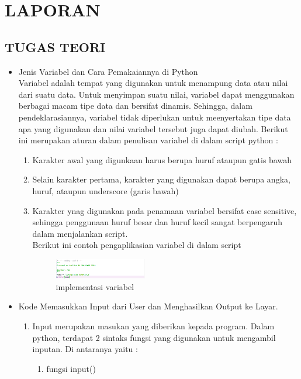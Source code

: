 \chapter{LAPORAN}
\section{TUGAS TEORI}
\begin{itemize}
	\item Jenis Variabel dan Cara Pemakaiannya di Python\\
		Variabel adalah tempat yang digunakan untuk menampung data atau nilai dari suatu data. Untuk menyimpan suatu nilai, variabel dapat menggunakan berbagai macam tipe data dan bersifat dinamis. Sehingga, dalam pendeklarasiannya, variabel tidak diperlukan untuk meenyertakan tipe data apa yang digunakan dan nilai variabel tersebut juga dapat diubah.
		Berikut ini merupakan aturan dalam penulisan variabel di dalam script python :
		\begin{enumerate}
			\item Karakter awal yang digunkaan harus berupa huruf ataupun gatis bawah
			\item Selain karakter pertama, karakter yang digunakan dapat berupa angka, huruf, ataupun underscore (garis bawah)
			\item Karakter ynag digunakan pada penamaan variabel bersifat case sensitive, sehingga penggunaan huruf besar dan huruf kecil sangat berpengaruh dalam menjalankan script.\\
			Berikut ini contoh pengaplikasian variabel di dalam script
			\begin{figure}[H]
			\includegraphics[width=4cm]{figures/1184030/variabel/1.png}
			\centering
			\caption{implementasi variabel}
			\end{figure}
		\end{enumerate}
	\item Kode Memasukkan Input dari User dan Menghasilkan Output ke Layar.\\
	\begin{enumerate}
	\item Input merupakan masukan yang diberikan kepada program. Dalam python, terdapat 2 sintaks fungsi yang digunakan untuk mengambil inputan. Di antaranya yaitu :
		\begin{enumerate}
		\item fungsi input()\\

\end{enumerate}
\end{enumerate}
\end{itemize}
